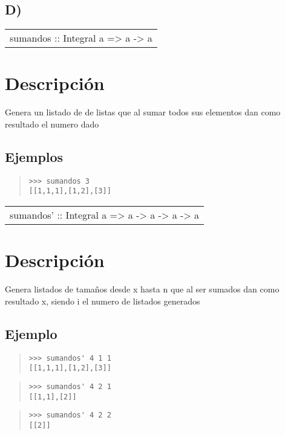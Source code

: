 \subsection{D)}
\begin{haddockdesc}
\item[\begin{tabular}{@{}l}
sumandos :: Integral a => a -> {\char 91}{\char 91}a{\char 93}{\char 93}
\end{tabular}]
{\haddockbegindoc
\section*{Descripción}
Genera un listado de de listas que al sumar todos sus elementos dan como resultado el numero dado\par
\subsection*{Ejemplos}
\begin{quote}
{\haddockverb\begin{verbatim}
>>> sumandos 3
[[1,1,1],[1,2],[3]]

\end{verbatim}}
\end{quote}}
\end{haddockdesc}
\begin{haddockdesc}
\item[\begin{tabular}{@{}l}
sumandos' :: Integral a => a -> a -> a -> {\char 91}{\char 91}a{\char 93}{\char 93}
\end{tabular}]
{\haddockbegindoc
\section*{Descripción}
Genera listados de tamaños desde x hasta n que al ser sumados dan como resultado x, siendo i el numero de listados generados\par
\subsection*{Ejemplo}
\begin{quote}
{\haddockverb\begin{verbatim}
>>> sumandos' 4 1 1
[[1,1,1],[1,2],[3]]

\end{verbatim}}
\end{quote}
\begin{quote}
{\haddockverb\begin{verbatim}
>>> sumandos' 4 2 1
[[1,1],[2]]

\end{verbatim}}
\end{quote}
\begin{quote}
{\haddockverb\begin{verbatim}
>>> sumandos' 4 2 2
[[2]]

\end{verbatim}}
\end{quote}}
\end{haddockdesc}